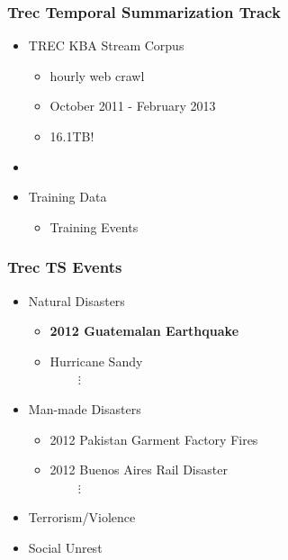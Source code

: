 \documentclass{beamer}
\begin{document}
\begin{frame}
\frametitle{Trec Temporal Summarization Track}
\begin{itemize}
\pause
\item TREC KBA Stream Corpus
\pause
\begin{itemize}
\item hourly web crawl
\item October 2011 - February 2013
\item 16.1TB!
\end{itemize}
\pause
\item[]
\item Training Data
\begin{itemize}
\item Training Events
\end{itemize}
\end{itemize}
\end{frame}

\begin{frame}
\frametitle{Trec TS Events}
\begin{itemize}
    \item{Natural Disasters}
        \begin{itemize}
            \item{\textbf{2012 Guatemalan Earthquake}}
            \item{Hurricane Sandy\\}
            $\;\;\;\;\;\;\;\;\vdots$
        \end{itemize}
    \item{Man-made Disasters}
        \begin{itemize}
            \item{2012 Pakistan Garment Factory Fires}
            \item{2012 Buenos Aires Rail Disaster\\}
            $\;\;\;\;\;\;\;\;\vdots$
        \end{itemize}
    \item{Terrorism/Violence}
    \item{Social Unrest}
\end{itemize}
\end{frame}
\end{document}
